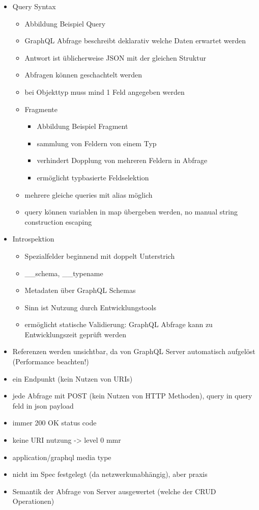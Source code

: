 \begin{itemize}
  \item Query Syntax
  \begin{itemize}
    \item Abbildung Beispiel Query
    \item GraphQL Abfrage beschreibt deklarativ welche Daten erwartet werden
    \item Antwort ist üblicherweise JSON mit der gleichen Struktur
    \item Abfragen können geschachtelt werden
    \item bei Objekttyp muss mind 1 Feld angegeben werden
    \item Fragmente
    \begin{itemize}
      \item Abbildung Beispiel Fragment
      \item sammlung von Feldern von einem Typ
      \item verhindert Dopplung von mehreren Feldern in Abfrage
      \item ermöglicht typbasierte Feldselektion
    \end{itemize}
    \item mehrere gleiche queries mit alias möglich
    \item query können variablen in map übergeben werden, no manual string construction escaping
  \end{itemize}
  \item Introspektion
  \begin{itemize}
    \item Spezialfelder beginnend mit doppelt Unterstrich
    \item \_\_schema, \_\_typename
    \item Metadaten über GraphQL Schemas
    \item Sinn ist Nutzung durch Entwicklungstools
    \item ermöglicht statische Validierung: GraphQL Abfrage kann zu Entwicklungszeit geprüft werden
  \end{itemize}
  \item Referenzen werden unsichtbar, da von GraphQL Server automatisch aufgelöst (Performance beachten!)
  \item ein Endpunkt (kein Nutzen von URIs)
  \item jede Abfrage mit POST (kein Nutzen von HTTP Methoden), query in query feld in json payload
  \item immer 200 OK status code
  \item keine URI nutzung -> level 0 mmr
  \item application/graphql media type
  \item nicht im Spec festgelegt (da netzwerkunabhängig), aber praxis
  \item Semantik der Abfrage von Server ausgewertet (welche der CRUD Operationen)
\end{itemize}

